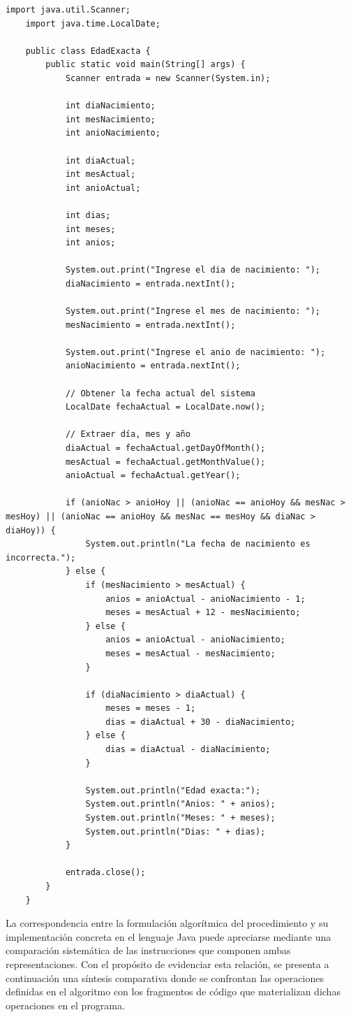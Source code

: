\documentclass[12pt,twoside]{book}
\begin{document}
					\begin{lstlisting}[style=Java,caption={Resolución de una ecuación cuadrática},label={lst:edadExacta}]
	import java.util.Scanner;
	import java.time.LocalDate;
	
	public class EdadExacta {
		public static void main(String[] args) {
			Scanner entrada = new Scanner(System.in);
			
			int diaNacimiento;
			int mesNacimiento;
			int anioNacimiento;
			
			int diaActual;
			int mesActual;
			int anioActual;
			
			int dias;
			int meses;
			int anios;
			
			System.out.print("Ingrese el dia de nacimiento: ");
			diaNacimiento = entrada.nextInt();
			
			System.out.print("Ingrese el mes de nacimiento: ");
			mesNacimiento = entrada.nextInt();
			
			System.out.print("Ingrese el anio de nacimiento: ");
			anioNacimiento = entrada.nextInt();
			
			// Obtener la fecha actual del sistema
			LocalDate fechaActual = LocalDate.now();
			
			// Extraer día, mes y año
			diaActual = fechaActual.getDayOfMonth();
			mesActual = fechaActual.getMonthValue();
			anioActual = fechaActual.getYear();
			
			if (anioNac > anioHoy || (anioNac == anioHoy && mesNac > mesHoy) || (anioNac == anioHoy && mesNac == mesHoy && diaNac > diaHoy)) {
				System.out.println("La fecha de nacimiento es incorrecta.");
			} else {
				if (mesNacimiento > mesActual) {
					anios = anioActual - anioNacimiento - 1;
					meses = mesActual + 12 - mesNacimiento;
				} else {
					anios = anioActual - anioNacimiento;
					meses = mesActual - mesNacimiento;
				}
				
				if (diaNacimiento > diaActual) {
					meses = meses - 1;
					dias = diaActual + 30 - diaNacimiento;
				} else {
					dias = diaActual - diaNacimiento;
				}
				
				System.out.println("Edad exacta:");
				System.out.println("Anios: " + anios);
				System.out.println("Meses: " + meses);
				System.out.println("Dias: " + dias);
			}
			
			entrada.close();
		}
	} \end{lstlisting}
					\noindent
					La correspondencia entre la formulación algorítmica del procedimiento y su implementación concreta en el lenguaje Java puede apreciarse mediante una comparación sistemática de las instrucciones que componen ambas representaciones. Con el propósito de evidenciar esta relación, se presenta a continuación una síntesis comparativa donde se confrontan las operaciones definidas en el algoritmo con los fragmentos de código que materializan dichas operaciones en el programa. 
					
\end{document}
